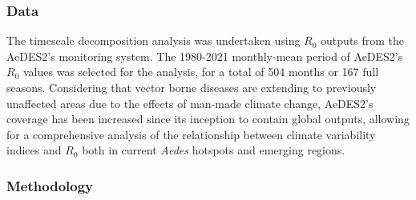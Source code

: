 \documentclass[10pt,twocolumn]{wlscirep}
\begin{document}
\subsubsection{Data} \label{sec-methods-1-data}
The timescale decomposition analysis was undertaken using $R_0$ outputs from the AeDES2's monitoring system. The 1980-2021 monthly-mean period of AeDES2's $R_0$ values was selected for the analysis, for a total of 504 months or 167 full seasons. Considering that vector borne diseases are extending to previously unaffected areas due to the effects of man-made climate change, AeDES2's coverage has been increased since its inception to contain global outputs, allowing for a comprehensive analysis of the relationship between climate variability indices and $R_0$ both in current \textit{Aedes} hotspots and emerging regions.

\subsubsection{Methodology} \label{sec-methods-1-methodology}
\end{document}
